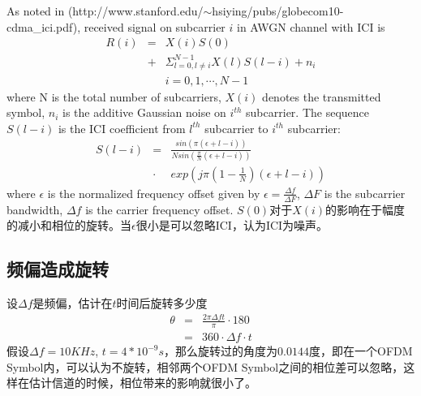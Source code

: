 As noted in (http://www.stanford.edu/$\sim$hsiying/pubs/globecom10-cdma\_ici.pdf), 
received signal on subcarrier $i$ in AWGN channel with ICI is
\begin{eqnarray}
R(i) & = & X(i)S(0) \\
      & + & \Sigma_{l=0, l \neq i}^{N-1} X(l)S(l-i) + n_{i} \\
      &     & i = 0, 1, \cdots, N-1 \nonumber
\end{eqnarray}
where N is the total number of subcarriers, $X(i)$ denotes the transmitted symbol, $n_{i}$ is the additive Gaussian noise on $i^{th}$ subcarrier. The sequence $S(l-i)$ is the ICI coefficient from $l^{th}$ subcarrier to $i^{th}$ subcarrier:
\begin{eqnarray}
S(l-i) & = & \frac{sin(\pi (\epsilon + l - i))}{N sin(\frac{\pi}{N}(\epsilon + l - i))} \\
         & \cdot  & exp( j\pi (1 - \frac{1}{N})(\epsilon + l - i))
\end{eqnarray}
where $\epsilon$ is the normalized frequency offset given by $\epsilon = \frac{\Delta f}{\Delta F}$, $\Delta F$ is the subcarrier bandwidth, $\Delta f$ is the carrier frequency offset.
$S(0)$对于$X(i)$的影响在于幅度的减小和相位的旋转。当$\epsilon$很小是可以忽略ICI，认为ICI为噪声。

\subsection{频偏造成旋转}
设$\Delta f$是频偏，估计在$t$时间后旋转多少度
\begin{eqnarray}
\theta & = & \frac{2 \pi \Delta f t}{\pi} \cdot 180 \\
           & = & 360 \cdot \Delta f \cdot t
\end{eqnarray}
假设$\Delta f =  10 KHz$, $t=4 * 10^{-9}s$，那么旋转过的角度为$0.0144$度，即在一个OFDM Symbol内，可以认为不旋转，相邻两个OFDM Symbol之间的相位差可以忽略，这样在估计信道的时候，相位带来的影响就很小了。



